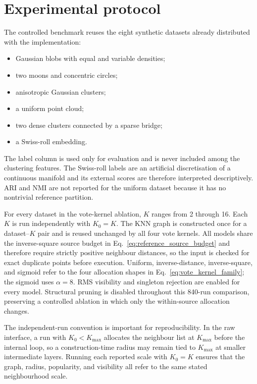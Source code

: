 \documentclass[review,12pt]{elsarticle}
\begin{document}
\section{Experimental protocol}\label{sec:experimental_protocol}

The controlled benchmark reuses the eight synthetic datasets already distributed with the implementation:
\begin{itemize}
    \item Gaussian blobs with equal and variable densities;
    \item two moons and concentric circles;
    \item anisotropic Gaussian clusters;
    \item a uniform point cloud;
    \item two dense clusters connected by a sparse bridge;
    \item a Swiss-roll embedding.
\end{itemize}
The label column is used only for evaluation and is never included among the clustering features. The Swiss-roll labels are an artificial discretisation of a continuous manifold and its external scores are therefore interpreted descriptively. ARI and NMI are not reported for the uniform dataset because it has no nontrivial reference partition.

For every dataset in the vote-kernel ablation, $K$ ranges from 2 through 16. Each $K$ is run independently with $K_0=K$. The KNN graph is constructed once for a dataset--$K$ pair and is reused unchanged by all four vote kernels. All models share the inverse-square source budget in Eq.~\eqref{eq:reference_source_budget} and therefore require strictly positive neighbour distances, so the input is checked for exact duplicate points before execution. Uniform, inverse-distance, inverse-square, and sigmoid refer to the four allocation shapes in Eq.~\eqref{eq:vote_kernel_family}; the sigmoid uses $\alpha=8$. RMS visibility and singleton rejection are enabled for every model. Structural pruning is disabled throughout this 840-run comparison, preserving a controlled ablation in which only the within-source allocation changes.

The independent-run convention is important for reproducibility. In the raw
interface, a run with $K_0<K_{\max}$ allocates the neighbour list at
$K_{\max}$ before the internal loop, so a construction-time radius may remain
tied to $K_{\max}$ at smaller intermediate layers. Running each reported scale
with $K_0=K$ ensures that the graph, radius, popularity, and visibility all
refer to the same stated neighbourhood scale.
\end{document}
